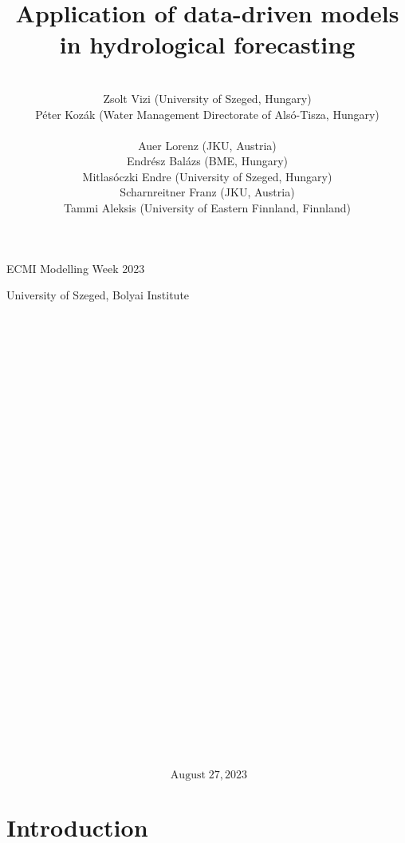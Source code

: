 \documentclass{article}
\newcommand{\tmaffiliation}[1]{\\ #1}
\newcommand{\tmop}[1]{\ensuremath{\operatorname{#1}}}
\begin{document}

ECMI Modelling Week 2023

University of Szeged, Bolyai Institute

\

\

\

\title{Application of data-driven models in hydrological forecasting}

\author{
  
  \tmaffiliation{Zsolt Vizi (University of Szeged, Hungary)\\
  P{\'e}ter Koz{\'a}k (Water Management Directorate of Als{\'o}-Tisza,
  Hungary)\\
  \\
  Auer Lorenz (JKU, Austria)\\
  Endr{\'e}sz Bal{\'a}zs (BME, Hungary)\\
  Mitlas{\'o}czki Endre (University of Szeged, Hungary)\\
  Scharnreitner Franz (JKU, Austria)\\
  Tammi Aleksis (University of Eastern Finnland, Finnland)}
}

\maketitle

\

\

\

\

\

\

\

\

\

\

\

\

\

\


\[ \tmop{August} 27, 2023 \]
{\newpage}

{\tableofcontents}

{\newpage}

\section{Introduction}
\end{document}
